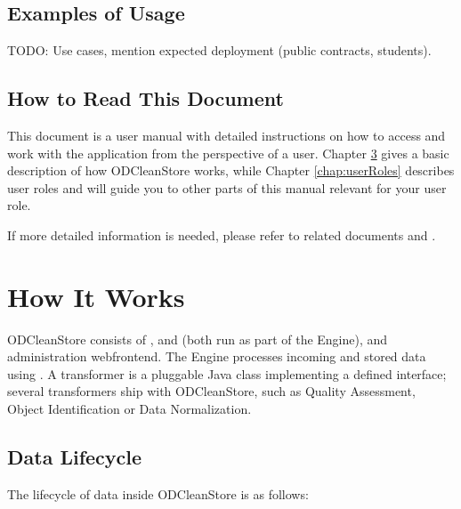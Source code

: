 \section{Examples of Usage}

TODO: Use cases, mention expected deployment (public contracts, students).


\section{How to Read This Document}

This document is a user manual with detailed instructions on how to access and work with the application from the perspective of a user. Chapter \ref{chap:howItWorks} gives a basic description of how ODCleanStore works, while Chapter \ref{chap:userRoles} describes user roles and will guide you to other parts of this manual relevant for your user role.

If more detailed information is needed, please refer to related documents  and .


\chapter{How It Works}
\label{chap:howItWorks}

ODCleanStore consists of ,  and  (both run as part of the Engine), and administration webfrontend. The Engine processes incoming and stored data using . A transformer is a pluggable Java class implementing a defined interface; several transformers ship with ODCleanStore, such as Quality Assessment, Object Identification or Data Normalization.


\section{Data Lifecycle}

The lifecycle of data inside ODCleanStore is as follows:

